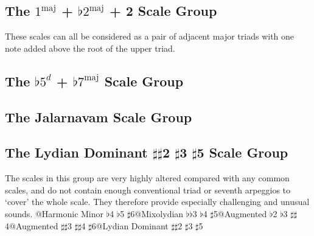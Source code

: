 \documentclass[english]{./gbook}
\begin{document}
\begin{large}

\subsection{The $1^{\text{maj}}$ + $\flat 2^{\text{maj}}$ + 2 Scale Group}

These scales can all be considered as a pair of adjacent major triads with one note added above the root of the upper triad.



\subsection{The $\flat 5^d$ + $\flat 7^{\text{maj}}$ Scale Group}

\subsection{The Jalarnavam Scale Group}

\subsection{The Lydian Dominant $\sharp\sharp$2 $\sharp$3 $\sharp$5 Scale Group}
The scales in this group are very highly altered compared with any common scales, and do not contain enough conventional triad or seventh arpeggios to `cover' the whole scale. They therefore provide especially challenging and unusual sounds.
@Harmonic Minor $\flat$4 $\flat$5 $\sharp$6@Mixolydian $\flat\flat$3 $\flat$4 $\sharp$5@Augmented $\flat$2 $\flat$3 $\sharp\sharp$4@Augmented $\sharp\sharp$3 $\sharp\sharp$4 $\sharp$6@Lydian Dominant $\sharp\sharp$2 $\sharp$3 $\sharp$5%


\end{large}
\end{document}
